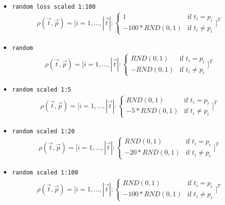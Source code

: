 \documentclass[twoside,11pt]{article}
\begin{document}
\begin{itemize}
  \item \texttt{random loss scaled 1:100}
    \begin{align*}
      \rho(\vec{t}, \vec{p}) = \Bigg[
      i=1,\dots,|\vec{t}|:
      \begin{cases}
        1  &\text{if } t_i = p_i \\
        -100 * RND(0,1) &\text{if } t_i \neq p_i
      \end{cases}\Bigg]^T
    \end{align*}

  \item \texttt{random}
    \begin{align*}
      \rho(\vec{t}, \vec{p}) = \Bigg[
      i=1,\dots,|\vec{t}|:
      \begin{cases}
        RND(0,1) &\text{if } t_i = p_i \\
        -RND(0,1) &\text{if } t_i \neq p_i
      \end{cases} \Bigg]^T
    \end{align*}

  \item \texttt{random scaled 1:5}
    \begin{align*}
      \rho(\vec{t}, \vec{p}) = \Bigg[
      i=1,\dots,|\vec{t}|:
      \begin{cases}
        RND(0,1)  &\text{if } t_i = p_i \\
        -5 * RND(0,1) &\text{if } t_i \neq p_i
      \end{cases} \Bigg]^T
    \end{align*}

  \item \texttt{random scaled 1:20}
    \begin{align*}
      \rho(\vec{t}, \vec{p}) = \Bigg[
      i=1,\dots,|\vec{t}|:
      \begin{cases}
        RND(0,1)  &\text{if } t_i = p_i \\
        -20 * RND(0,1) &\text{if } t_i \neq p_i
      \end{cases} \Bigg]^T
    \end{align*}

  \item \texttt{random scaled 1:100}
    \begin{align*}
      \rho(\vec{t}, \vec{p}) = \Bigg[
      i=1,\dots,|\vec{t}|:
      \begin{cases}
        RND(0,1)  &\text{if } t_i = p_i \\
        -100 * RND(0,1) &\text{if } t_i \neq p_i
      \end{cases} \Bigg]^T
    \end{align*}


\end{itemize}
\end{document}
